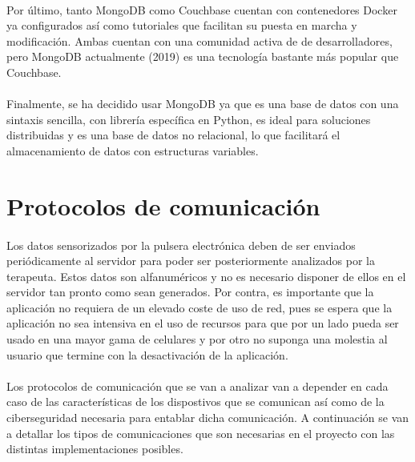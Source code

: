 \begin{itemize}
\paragraph{}
Por último, tanto MongoDB como Couchbase cuentan con contenedores Docker ya configurados así como tutoriales que facilitan su puesta en marcha y modificación. Ambas cuentan con una comunidad activa de de desarrolladores, pero MongoDB actualmente (2019) es una tecnología bastante más popular que Couchbase.
\end{itemize}

\paragraph{}
Finalmente, se ha decidido usar MongoDB ya que es una base de datos con una sintaxis sencilla, con librería específica en Python, es ideal para soluciones distribuidas y es una base de datos no relacional, lo que facilitará el almacenamiento de datos con estructuras variables.

\section{Protocolos de comunicación}
\paragraph{}
Los datos sensorizados por la pulsera electrónica deben de ser enviados periódicamente al servidor para poder ser posteriormente analizados por la terapeuta. Estos datos son alfanuméricos y no es necesario disponer de ellos en el servidor tan pronto como sean generados. Por contra, es importante que la aplicación no requiera de un elevado coste de uso de red, pues se espera que la aplicación no sea intensiva en el uso de recursos para que por un lado pueda ser usado en una mayor gama de celulares y por otro no suponga una molestia al usuario que termine con la desactivación de la aplicación.

\paragraph{}
Los protocolos de comunicación que se van a analizar van a depender en cada caso de las características de los dispostivos que se comunican así como de la ciberseguridad necesaria para entablar dicha comunicación. A continuación se van a detallar los tipos de comunicaciones que son necesarias en el proyecto con las distintas implementaciones posibles.

